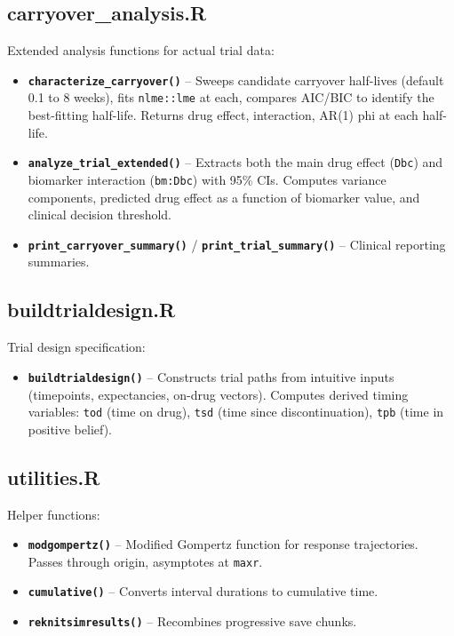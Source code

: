 \documentclass[11pt]{article}
\begin{document}
\subsection{carryover\_analysis.R}

Extended analysis functions for actual trial data:

\begin{itemize}
  \item \textbf{\texttt{characterize\_carryover()}} -- Sweeps candidate
    carryover half-lives (default 0.1 to 8 weeks), fits
    \texttt{nlme::lme} at each, compares AIC/BIC to identify the
    best-fitting half-life. Returns drug effect, interaction,
    AR(1) phi at each half-life.

  \item \textbf{\texttt{analyze\_trial\_extended()}} -- Extracts both the main
    drug effect (\texttt{Dbc}) and biomarker interaction (\texttt{bm:Dbc})
    with 95\% CIs. Computes variance components, predicted
    drug effect as a function of biomarker value, and
    clinical decision threshold.

  \item \textbf{\texttt{print\_carryover\_summary()}} / \textbf{\texttt{print\_trial\_summary()}}
    -- Clinical reporting summaries.
\end{itemize}

\subsection{buildtrialdesign.R}

Trial design specification:

\begin{itemize}
  \item \textbf{\texttt{buildtrialdesign()}} -- Constructs trial paths from
    intuitive inputs (timepoints, expectancies, on-drug
    vectors). Computes derived timing variables: \texttt{tod}
    (time on drug), \texttt{tsd} (time since discontinuation),
    \texttt{tpb} (time in positive belief).
\end{itemize}

\subsection{utilities.R}

Helper functions:

\begin{itemize}
  \item \textbf{\texttt{modgompertz()}} -- Modified Gompertz function for
    response trajectories. Passes through origin, asymptotes
    at \texttt{maxr}.
  \item \textbf{\texttt{cumulative()}} -- Converts interval durations to
    cumulative time.
  \item \textbf{\texttt{reknitsimresults()}} -- Recombines progressive save
    chunks.
\end{itemize}
\end{document}
